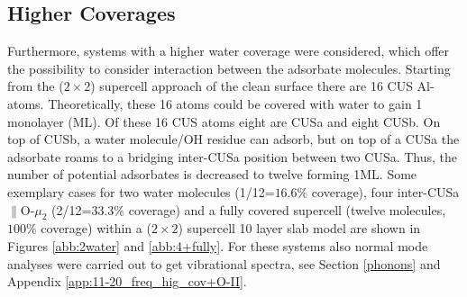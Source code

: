 \documentclass[11pt,DIV=13,BCOR=5mm,a4paper,headinclude]{scrbook}
\begin{document}
\subsection{Higher Coverages}\label{sec:high_cov-ads}

Furthermore, systems with a higher water coverage were considered, which offer the possibility to consider interaction between the adsorbate molecules.
Starting from the ($2\times 2$) supercell approach of the clean surface there are 16 CUS Al-atoms.
Theoretically, these 16 atoms could be covered with water to gain 1 monolayer (ML).
Of these 16 CUS atoms eight are CUSa and eight CUSb.
On top of CUSb, a water molecule/OH residue can adsorb, but on top of a CUSa the adsorbate roams to a bridging inter-CUSa position between two CUSa.
Thus, the number of potential adsorbates is decreased to twelve forming 1ML.
Some exemplary cases for two water molecules (1/12=$16.6\%$ coverage), four inter-CUSa$\parallel$O-$\mu_2$ (2/12=$33.3\%$ coverage) and a fully covered supercell (twelve molecules, $100\%$ coverage) within a ($2\times 2$) supercell 10 layer slab model are shown in Figures \ref{abb:2water} and \ref{abb:4+fully}.
For these systems also normal mode analyses were carried out to get vibrational spectra, see Section \ref{phonons} and Appendix \ref{app:11-20_freq_hig_cov+O-II}.
\end{document}
